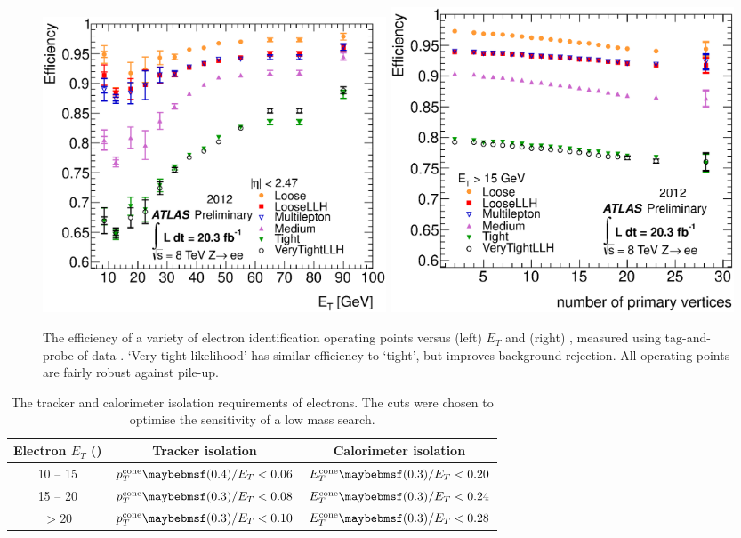 \begin{figure}
	\includegraphics[width=0.495\textwidth]{tex/selection/el_ideff_et}
	\hfill
	\includegraphics[width=0.495\textwidth]{tex/selection/el_ideff_npv}
	\caption{The efficiency of a variety of electron identification operating points 
	versus (left) $E_T$ and (right) \npv, measured using tag-and-probe of 
	\HepProcess{\PZ \HepTo \Pe\Pe} data \cite{ElectronPerf:2012}. `Very tight likelihood' 
	has similar efficiency to `tight', but improves background rejection. All operating 
	points are fairly robust against pile-up.}
	\label{fig:objects:el_ideff}
\end{figure}

\begin{table}[h]
	\begin{tabular}{c@{\hskip 0.3in}c@{\hskip 0.3in}c}
		Electron $E_T$ (\GeV) & Tracker isolation & Calorimeter isolation \\
		\hline
		10 -- 15 & $p_T^{\text{cone}}\parenths{0.4}/E_T < 0.06$ & $E_T^{\text{cone}}\parenths{0.3}/E_T < 0.20$ \\
		15 -- 20 & $p_T^{\text{cone}}\parenths{0.3}/E_T < 0.08$ & $E_T^{\text{cone}}\parenths{0.3}/E_T < 0.24$ \\
		$> 20$   & $p_T^{\text{cone}}\parenths{0.3}/E_T < 0.10$ & $E_T^{\text{cone}}\parenths{0.3}/E_T < 0.28$ \\
	\end{tabular}
	\caption{The tracker and calorimeter isolation requirements of electrons. The cuts 
	were chosen to optimise the sensitivity of a low mass \HWWlvlv search.}
	\label{tab:objects:el_iso}
\end{table}

